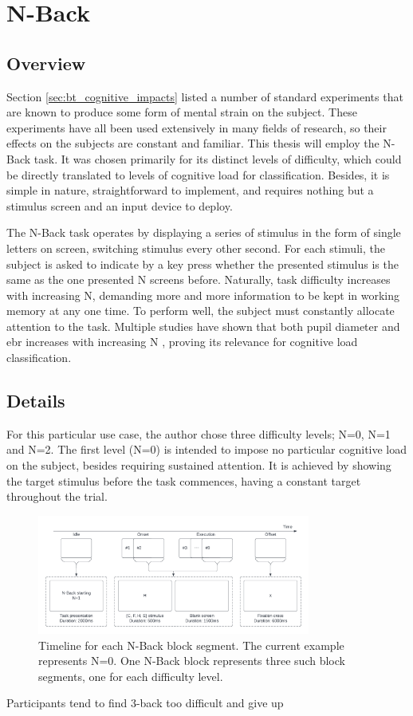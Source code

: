 \section{N-Back} \label{sec:impl/tasks}
\subsection{Overview}

Section \ref{sec:bt_cognitive_impacts} listed a number of standard experiments that are known to produce some form of mental strain on the subject. These experiments have all been used extensively in many fields of research, so their effects on the subjects are constant and familiar. This thesis will employ the N-Back task. It was chosen primarily for its distinct levels of difficulty, which could be directly translated to levels of cognitive load for classification. Besides, it is simple in nature, straightforward to implement, and requires nothing but a stimulus screen and an input device to deploy. 

The N-Back task operates by displaying a series of stimulus in the form of single letters on screen, switching stimulus every other second. For each stimuli, the subject is asked to indicate by a key press whether the presented stimulus is the same as the one presented N screens before. Naturally, task difficulty increases with increasing N, demanding more and more information to be kept in working memory at any one time. To perform well, the subject must constantly allocate attention to the task. Multiple studies have shown that both pupil diameter and \acrshort{ebr} increases with increasing N \cite{hopstaken2015, belayachi2015, brouwer2014, niezgoda2015}, proving its relevance for cognitive load classification. 

\subsection{Details}

For this particular use case, the author chose three difficulty levels; N=0, N=1 and N=2. The first level (N=0) is intended to impose no particular cognitive load on the subject, besides requiring sustained attention. It is achieved by showing the target stimulus before the task commences, having a constant target throughout the trial.

\begin{figure}[h]
    \centering
    \includegraphics[width=0.8\textwidth]{figures/impl_NBackBlock.png}
    \caption{Timeline for each N-Back block segment. The current example represents N=0. One N-Back block represents three such block segments, one for each difficulty level.}
    \label{fig:impl_NBackBlock}
\end{figure}

Participants tend to find 3-back too difficult and give up \cite{ayaz2007, izzetoglu2007}



